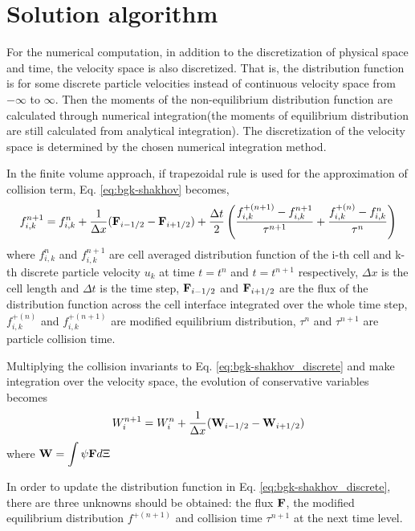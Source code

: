 \documentclass[a4paper]{book}
\begin{document}
\section{Solution algorithm}
For the numerical computation, in addition to the discretization of physical space and time, the velocity space is also discretized. That is, the distribution function is for some discrete particle velocities instead of continuous velocity space from $-\infty$ to $\infty$. Then the moments of the non-equilibrium distribution function are calculated through numerical integration(the moments of equilibrium distribution are still calculated from analytical integration). The discretization of the velocity space is determined by the chosen numerical integration method.

In the finite volume approach, if trapezoidal rule is used for the approximation of collision term, Eq. \ref{eq:bgk-shakhov} becomes,
\begin{equation} 
    \label{eq:bgk-shakhov_discrete}
    f_{i,k}^{n+1} = f_{i,k}^n+\frac{1}{\Delta x}({\bf F}_{i-1/2}-{\bf F}_{i+1/2})+\frac{\Delta t}{2}\left(\frac{f_{i,k}^{+(n+1)}-f_{i,k}^{n+1}}{\tau^{n+1}}+\frac{f_{i,k}^{+(n)}-f_{i,k}^n}{\tau^n}\right)
\end{equation}
where $f_{i,k}^n$ and $f_{i,k}^{n+1}$ are cell averaged distribution function of the i-th cell and k-th discrete particle velocity $u_k$ at time $t=t^n$ and $t=t^{n+1}$ respectively, $\Delta x$ is the cell length and $\Delta t$ is the time step, ${\bf F}_{i-1/2}$ and ${\bf F}_{i+1/2}$ are the flux of the distribution function across the cell interface integrated over the whole time step, $f_{i,k}^{+(n)}$ and $f_{i,k}^{+(n+1)}$ are modified equilibrium distribution, $\tau^n$ and $\tau^{n+1}$ are particle collision time.

Multiplying the collision invariants to Eq. \ref{eq:bgk-shakhov_discrete} and make integration over the velocity space, the evolution of conservative variables becomes
\begin{equation} 
    \label{eq:conservative_discrete}
    W_i^{n+1} = W_i^n+\frac{1}{\Delta x}({\bf W}_{i-1/2}-{\bf W}_{i+1/2})
\end{equation}
where $\displaystyle{\bf W} = \int\psi{\bf F}d\Xi$

In order to update the distribution function in Eq. \ref{eq:bgk-shakhov_discrete}, there are three unknowns should be obtained: the flux ${\bf F}$, the modified equilibrium distribution $f^{+(n+1)}$ and collision time $\tau^{n+1}$ at the next time level.
\end{document}
